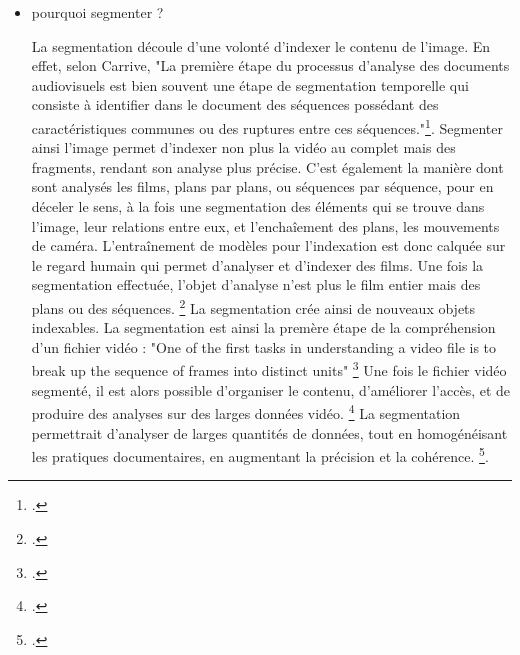 \begin{itemize}

(en quoi est ce différent d'une image fixe ? ça ne peut pas être appliqué aux images fixes ?). C'est plutot utilisé pour le montage : retirer des objets dans l'image par ex. Ca ne concerne pas la signification des images dans l'image, seulement leur place. 






\item pourquoi segmenter ?

La segmentation découle d'une volonté d'indexer le contenu de l'image. En effet, selon Carrive, "La première étape du processus d’analyse des documents audiovisuels est bien souvent une étape de segmentation temporelle qui consiste à identifier dans le document des séquences possédant des caractéristiques communes ou des ruptures entre ces séquences."\footcite{carrive2014}. Segmenter ainsi l'image permet d'indexer non plus la vidéo au complet mais des fragments, rendant son analyse plus précise. 
C'est également la manière dont sont analysés les films, plans par plans, ou séquences par séquence, pour en déceler le sens, à la fois une segmentation des éléments qui se trouve dans l'image, leur relations entre eux, et l'enchaîement des plans, les mouvements de caméra. L'entraînement de modèles pour l'indexation est donc calquée sur le regard humain qui permet d'analyser et d'indexer des films. 
Une fois la segmentation effectuée, l'objet d'analyse n'est plus le film entier mais des plans ou des séquences. \footcite{cordell} La segmentation crée ainsi de nouveaux objets indexables.
La segmentation est ainsi la premère étape de la compréhension d'un fichier vidéo : "One of the first tasks in understanding a video file is to break up the sequence of frames into distinct units" \footcite{arnold2019}
Une fois le fichier vidéo segmenté, il est alors possible d'organiser le contenu, d'améliorer l'accès, et de produire des analyses sur des larges données vidéo. \footcite{attard2025}
La segmentation permettrait d'analyser de larges quantités de données, tout en homogénéisant les pratiques documentaires, en augmentant la précision et la cohérence. \footcite{attard2025}.


\end{itemize}
